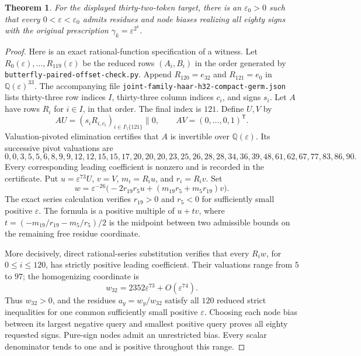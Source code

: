 \documentclass{article}
\newtheorem{theorem}{Theorem}
\begin{document}
\begin{theorem}
For the displayed thirty-two-token target, there is an $\varepsilon_0>0$
such that every $0<\varepsilon<\varepsilon_0$ admits residues and node
biases realizing all eighty signs with the original prescription
$\gamma_k=\varepsilon^{2^k}$.
\end{theorem}
\begin{proof}
Here is an exact rational-function specification of a witness. Let
$R_0(\varepsilon),\ldots,R_{119}(\varepsilon)$ be the reduced rows
$(A_i,B_i)$ in the order generated by
\texttt{butterfly-paired-offset-check.py}. Append
$R_{120}=e_{32}$ and $R_{121}=e_0$ in $\mathbb Q(\varepsilon)^{33}$.
The accompanying file
\texttt{joint-family-haar-h32-compact-germ.json} lists thirty-three row
indices $I$, thirty-three column indices $c_i$, and signs $s_i$.
Let $A$ have rows $R_i$ for $i\in I$, in that order. The final index is
$121$. Define $U,V$ by
\[
 A U=(s_iR_{i,c_i})_{i\in I\setminus\{121\}}\mathbin{\|}0,
 \qquad A V=(0,\ldots,0,1)^{\mathsf T}.
\]
Valuation-pivoted elimination certifies that $A$ is invertible over
$\mathbb Q(\varepsilon)$. Its successive pivot valuations are
\[
 0,0,3,5,5,6,8,9,9,12,12,15,15,17,20,20,20,
 23,25,26,28,28,34,36,39,48,61,62,67,77,83,86,90.
\]
Every corresponding leading coefficient is nonzero and is recorded in
the certificate. Put $u=\varepsilon^{73}U$, $v=V$,
$m_i=R_i u$, and $r_i=R_i v$. Set
\[
 w=\varepsilon^{-26}\bigl(-2r_{19}r_5u+
                  (m_{19}r_5+m_5r_{19})v\bigr).
\]
The exact series calculation verifies $r_{19}>0$ and $r_5<0$ for
sufficiently small positive $\varepsilon$. The formula is a positive
multiple of $u+tv$, where
$t=(-m_{19}/r_{19}-m_5/r_5)/2$ is the midpoint between two admissible
bounds on the remaining free residue coordinate.

More decisively, direct rational-series substitution verifies that every
$R_iw$, for $0\leq i\leq120$, has strictly positive leading coefficient.
Their valuations range from $5$ to $97$; the homogenizing coordinate is
\[
 w_{32}=2352\varepsilon^{73}+O(\varepsilon^{74}).
\]
Thus $w_{32}>0$, and the residues $a_y=w_y/w_{32}$ satisfy all $120$
reduced strict inequalities for one common sufficiently small positive
$\varepsilon$. Choosing each node bias between its largest negative
query and smallest positive query proves all eighty requested signs.
Pure-sign nodes admit an unrestricted bias. Every scalar denominator
tends to one and is positive throughout this range.
\end{proof}
\end{document}
